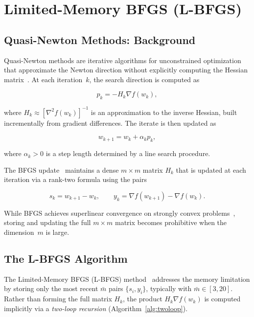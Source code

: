\documentclass[11pt,a4paper]{article}
\begin{document}
\section{Limited-Memory BFGS (L-BFGS)}
\label{sec:lbfgs}

\subsection{Quasi-Newton Methods: Background}

Quasi-Newton methods are iterative algorithms for unconstrained optimization that 
approximate the Newton direction without explicitly computing the Hessian 
matrix~\cite{nocedal2006numerical}. At each iteration~$k$, the search direction is 
computed as

\begin{equation}
\label{eq:qn_direction}
    p_k = -H_k \nabla f(w_k),
\end{equation}

where $H_k \approx [\nabla^2 f(w_k)]^{-1}$ is an approximation to the inverse Hessian, 
built incrementally from gradient differences. The iterate is then updated as

\begin{equation}
    w_{k+1} = w_k + \alpha_k p_k,
\end{equation}

where $\alpha_k > 0$ is a step length determined by a line search procedure.

The BFGS update~\cite{broyden1970} maintains a dense $m \times m$ matrix $H_k$ 
that is updated at each iteration via a rank-two formula using the pairs

\begin{equation}
    s_k = w_{k+1} - w_k, \qquad y_k = \nabla f(w_{k+1}) - \nabla f(w_k).
\end{equation}

While BFGS achieves superlinear convergence on strongly convex 
problems~\cite{nocedal2006numerical}, storing and updating the full $m \times m$ 
matrix becomes prohibitive when the dimension~$m$ is large.


\subsection{The L-BFGS Algorithm}

The Limited-Memory BFGS (L-BFGS) method~\cite{liu1989limited} addresses the memory 
limitation by storing only the most recent $\bar{m}$ pairs $\{s_i, y_i\}$, typically 
with $\bar{m} \in [3, 20]$. Rather than forming the full matrix $H_k$, the product 
$H_k \nabla f(w_k)$ is computed implicitly via a \emph{two-loop recursion} 
(Algorithm~\ref{alg:twoloop}).
\end{document}
